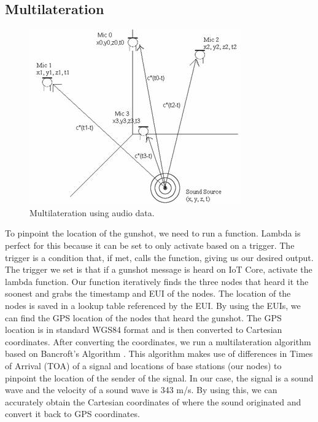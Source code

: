 \documentclass[conference]{IEEEtran}
\begin{document}
\subsection {Multilateration}

\begin{figure}[htbp]
\centerline{\includegraphics[width=0.7\columnwidth]{triangulate.png}}
\caption{Multilateration using audio data.}
\label{fig}
\end{figure}
To pinpoint the location of the gunshot, we need to run a function. Lambda is perfect for this because it can be set to only activate based on a trigger. The trigger is a condition that, if met, calls the function, giving us our desired output. The trigger we set is that if a gunshot message is heard on IoT Core, activate the lambda function. Our function iteratively finds the three nodes that heard it the soonest and grabs the timestamp and EUI of the nodes. The location of the nodes is saved in a lookup table referenced by the EUI. By using the EUIs, we can find the GPS location of the nodes that heard the gunshot. The GPS location is in standard WGS84 format and is then converted to Cartesian coordinates. After converting the coordinates, we run a multilateration algorithm based on Bancroft’s Algorithm \cite{b5}. This algorithm makes use of differences in Times of Arrival (TOA) of a signal and locations of base stations (our nodes) to pinpoint the location of the sender of the signal. In our case, the signal is a sound wave and the velocity of a sound wave is 343 m/s. By using this, we can accurately obtain the Cartesian coordinates of where the sound originated and convert it back to GPS coordinates.
\end{document}

